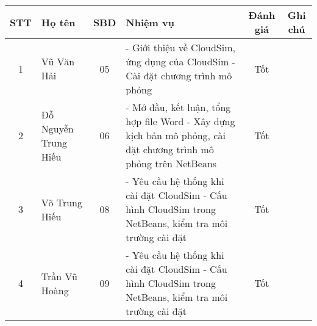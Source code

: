 
\renewcommand{\baselinestretch}{1.5}


\begin{table}[H]
\centering
\renewcommand{\arraystretch}{1.5} %
\setlength{\tabcolsep}{5pt}       %

{\fontsize{14pt}{18pt}\selectfont %

\begin{tabular}{|c|m{4cm}|c|m{4.5cm}|c|c|}
\hline
\centering\arraybackslash \textbf{STT} & 
\centering\arraybackslash \textbf{Họ tên} & 
\centering\arraybackslash \textbf{SBD} & 
\centering\arraybackslash \textbf{Nhiệm vụ} & 
\centering\arraybackslash \textbf{Đánh giá} & 
\centering\arraybackslash \textbf{Ghi chú} \\

\hline
1 & Vũ Văn Hải & 05 & 
- Giới thiệu về CloudSim, ứng dụng của CloudSim \newline
- Cài đặt chương trình mô phỏng & Tốt &  \\
\hline
2 & Đỗ Nguyễn Trung Hiếu & 06 & 
- Mở đầu, kết luận, tổng hợp file Word \newline
- Xây dựng kịch bản mô phỏng, cài đặt chương trình mô phỏng trên NetBeans & Tốt &  \\
\hline
3 & Võ Trung Hiếu & 08 & 
- Yêu cầu hệ thống khi cài đặt CloudSim \newline
- Cấu hình CloudSim trong NetBeans, kiểm tra môi trường cài đặt & Tốt &  \\
\hline
4 & Trần Vũ Hoàng & 09 & 
- Yêu cầu hệ thống khi cài đặt CloudSim \newline
- Cấu hình CloudSim trong NetBeans, kiểm tra môi trường cài đặt & Tốt &  \\
\hline

\end{tabular}
} %
\end{table}
